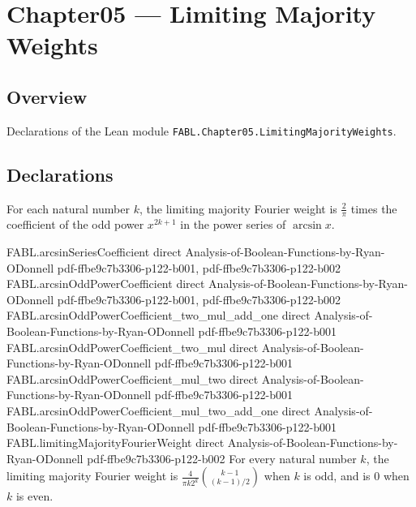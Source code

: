 \chapter{Chapter05 — Limiting Majority Weights}
\section{Overview}

Declarations of the Lean module \texttt{FABL.Chapter05.LimitingMajorityWeights}.

\section{Declarations}

\begin{definition}
\label{FABL.limitingMajorityFourierWeight}
\leanok
{}
For each natural number $k$, the limiting majority Fourier weight is $\frac{2}{\pi}$
times the coefficient of the odd power $x^{2k+1}$ in the power series of $\arcsin x$.
\end{definition}

\begin{theorem}
\label{FABL.limitingMajorityFourierWeight_eq}
\leanok
{}
\proofstep
  {FABL.arcsinSeriesCoefficient}
  {direct}
  {Analysis-of-Boolean-Functions-by-Ryan-ODonnell}
  {pdf-ffbe9c7b3306-p122-b001,
    pdf-ffbe9c7b3306-p122-b002}
\proofstep
  {FABL.arcsinOddPowerCoefficient}
  {direct}
  {Analysis-of-Boolean-Functions-by-Ryan-ODonnell}
  {pdf-ffbe9c7b3306-p122-b001,
    pdf-ffbe9c7b3306-p122-b002}
\proofstep
  {FABL.arcsinOddPowerCoefficient_two_mul_add_one}
  {direct}
  {Analysis-of-Boolean-Functions-by-Ryan-ODonnell}
  {pdf-ffbe9c7b3306-p122-b001}
\proofstep
  {FABL.arcsinOddPowerCoefficient_two_mul}
  {direct}
  {Analysis-of-Boolean-Functions-by-Ryan-ODonnell}
  {pdf-ffbe9c7b3306-p122-b001}
\proofstep
  {FABL.arcsinOddPowerCoefficient_mul_two}
  {direct}
  {Analysis-of-Boolean-Functions-by-Ryan-ODonnell}
  {pdf-ffbe9c7b3306-p122-b001}
\proofstep
  {FABL.arcsinOddPowerCoefficient_mul_two_add_one}
  {direct}
  {Analysis-of-Boolean-Functions-by-Ryan-ODonnell}
  {pdf-ffbe9c7b3306-p122-b001}
\proofstep
  {FABL.limitingMajorityFourierWeight}
  {direct}
  {Analysis-of-Boolean-Functions-by-Ryan-ODonnell}
  {pdf-ffbe9c7b3306-p122-b002}
For every natural number $k$, the limiting majority Fourier weight is $\frac{4}{\pi k
2^k}\binom{k-1}{(k-1)/2}$ when $k$ is odd, and is $0$ when $k$ is even.
\end{theorem}

